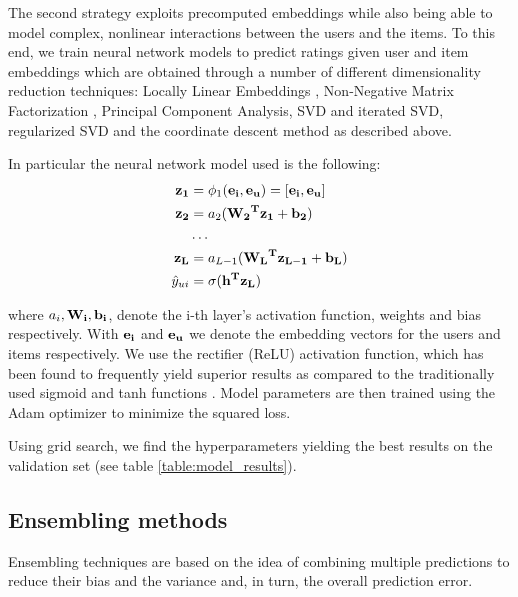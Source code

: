 \documentclass[10pt,conference,compsocconf]{IEEEtran}
\begin{document}
The second strategy exploits precomputed embeddings while also being able to model complex, nonlinear interactions  between the users and the items.
To this end, we train neural network models to predict ratings given user and item embeddings which are obtained through a number of different dimensionality reduction techniques: Locally Linear Embeddings \cite{roweis2000nonlinear}, Non-Negative Matrix Factorization \cite{cichocki2009fast}, Principal Component Analysis, SVD and iterated SVD, regularized SVD and the coordinate descent method as described above.

In particular the neural network model used is the following:
\begin{equation}
\begin{aligned}
    \bf{z_1} &= \phi_1(\bf{e_i}, \bf{e_u}) = [\bf{e_i}, \bf{e_u}]\\
    \bf{z_2} &= a_2(\bf{W_2}^T \bf{z_1} + b_2) \\
    &\dots \\
    \bf{z_L} &= a_{L - 1 }(\bf{W_{L}}^T \bf{z_{L - 1}} + b_L) \\
    \hat y_{ui} &= \sigma(\bf{h}^T \bf{z_L})
\end{aligned}
\end{equation}

where $a_i,\bf{W_i}, \bf{b_i}$, denote the i-th layer's activation function, weights and bias respectively. With $\bf{e_i}$ and $\bf{e_u}$ we denote the embedding vectors for the users and items respectively. We use the rectifier (ReLU) activation function, which has been found to frequently yield superior results as compared to the traditionally used sigmoid and tanh functions \cite{glorot2011deep}. %
Model parameters are then trained using the Adam optimizer \cite{kingma2014adam} to minimize the squared loss.

Using grid search,  we find the hyperparameters yielding the best results on the validation set (see table \ref{table:model_results}).


\subsection{Ensembling methods}
\label{sec:ensembling}
Ensembling techniques are based on the idea of combining multiple predictions to reduce their bias and the variance and, in turn, the overall prediction error.
\end{document}
